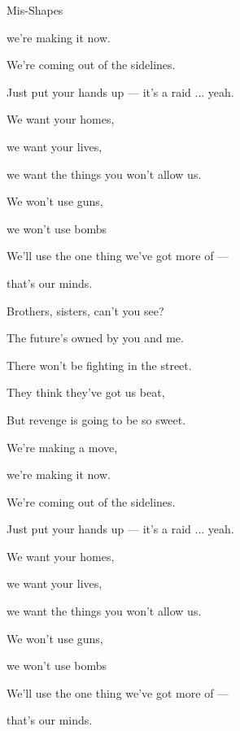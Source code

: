 \begin{song}{Mis-Shapes}{

    \chordset[Verse]{ \AMaj \EMaj \Fshm \DMaj \DSeven}

    \chordset[Chorus]{ \GMaj \GMajSeven \GSeven \CMaj \CMajSeven \CSeven }
	
	\chordset{ \Em \EmSix \EmaddC }

}
\begin{songchorus}
		we're making it now. 

		We're coming out of the sidelines. 

		\quad Just put your hands up --- it's a raid ... yeah.

		We want your homes,

		we want your lives,

		we want the things you won't allow us. 

		We won't use guns, 

		we won't use bombs

		We'll use the one thing we've got more of ---

		that's our minds.  \hspace{30pt}  \qquad {}

	\end{songchorus}

	\begin{songverse}
				Brothers, sisters, can't you see? 

		The future's owned by you and me. 

		There won't be fighting in the street. 

		They think they've got us beat, 

		But revenge is going to be so sweet. 
	\end{songverse}

	\begin{songchorus}		

		
		 \quad We're making a move, 

		we're making it now. 

		We're coming out of the sidelines. 

		\quad Just put your hands up --- it's a raid ... yeah.

		We want your homes,

		we want your lives,

		we want the things you won't allow us. 

		We won't use guns, 

		we won't use bombs

		We'll use the one thing we've got more of ---

		that's our minds.  \hspace{30pt}  \qquad {}

	 \end{songchorus}

\end{song}